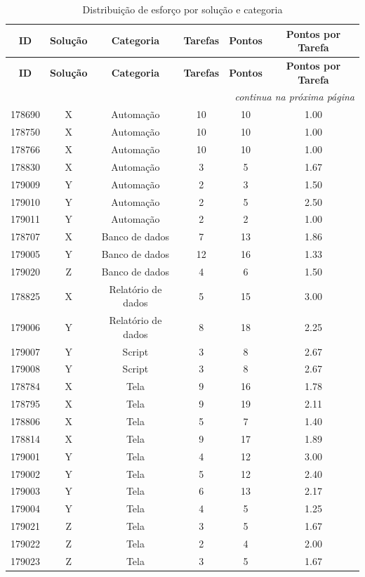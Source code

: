 	\begin{longtable}{cccccc}
		\label{tab:esforco_solucoes_resultado} \\
		\toprule
		\textbf{ID} & \textbf{Solução} & \textbf{Categoria} & \textbf{Tarefas} & \textbf{Pontos} & \textbf{Pontos por Tarefa} \\
		\midrule
		\endfirsthead

		\toprule
		\textbf{ID} & \textbf{Solução} & \textbf{Categoria} & \textbf{Tarefas} & \textbf{Pontos} & \textbf{Pontos por Tarefa} \\
		\midrule
		\endhead

		\midrule
		\multicolumn{6}{r}{\textit{continua na próxima página}} \\
		\midrule
		\endfoot

		\bottomrule
		\caption{Distribuição de esforço por solução e categoria}
		\endlastfoot

		178690 & X & Automação & 10 & 10 & 1.00 \\
		178750 & X & Automação & 10 & 10 & 1.00 \\
		178766 & X & Automação & 10 & 10 & 1.00 \\
		178830 & X & Automação & 3 & 5 & 1.67 \\
		179009 & Y & Automação & 2 & 3 & 1.50 \\
		179010 & Y & Automação & 2 & 5 & 2.50 \\
		179011 & Y & Automação & 2 & 2 & 1.00 \\
		178707 & X & Banco de dados & 7 & 13 & 1.86 \\
		179005 & Y & Banco de dados & 12 & 16 & 1.33 \\
		179020 & Z & Banco de dados & 4 & 6 & 1.50 \\
		178825 & X & Relatório de dados & 5 & 15 & 3.00 \\
		179006 & Y & Relatório de dados & 8 & 18 & 2.25 \\
		179007 & Y & Script & 3 & 8 & 2.67 \\
		179008 & Y & Script & 3 & 8 & 2.67 \\
		178784 & X & Tela & 9 & 16 & 1.78 \\
		178795 & X & Tela & 9 & 19 & 2.11 \\
		178806 & X & Tela & 5 & 7 & 1.40 \\
		178814 & X & Tela & 9 & 17 & 1.89 \\
		179001 & Y & Tela & 4 & 12 & 3.00 \\
		179002 & Y & Tela & 5 & 12 & 2.40 \\
		179003 & Y & Tela & 6 & 13 & 2.17 \\
		179004 & Y & Tela & 4 & 5 & 1.25 \\
		179021 & Z & Tela & 3 & 5 & 1.67 \\
		179022 & Z & Tela & 2 & 4 & 2.00 \\
		179023 & Z & Tela & 3 & 5 & 1.67 \\
	\end{longtable}


